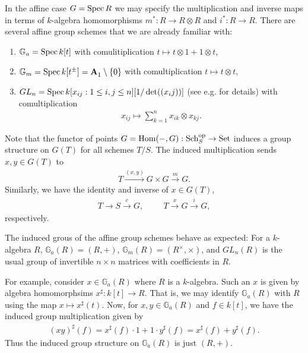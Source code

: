 \documentclass{article}
\begin{document}
\begin{example}
  In the affine case $G = \operatorname{Spec} R$ we may specify the multiplication
  and inverse maps in terms of $k$-algebra homomorphisms
  $m^* : R \to R\otimes R$ and $i^* : R\to R$.
  There are several affine group schemes that we are already familiar
  with:
  \begin{enumerate}
    \item $\mathbb{G}_a = \operatorname{Spec} k[t]$ with comulitiplication
      $t\mapsto t\otimes 1 + 1\otimes t$,
    \item $\mathbb{G}_m = \operatorname{Spec} k[t^\pm] = \mathbf{A}^{}_{1} \setminus \left\lbrace{0}\right\rbrace$ with comultiplication
      $t\mapsto t\otimes t$,
    \item $GL_n = \operatorname{Spec} k[x_{ij} : 1\leq i,j\leq n][1/\det((x_ij))]$
      (see e.g. \cite[\href{https://stacks.math.columbia.edu/tag/022W}{Tag 022W}]{stacks-project} for details) with
      comultiplication
      \begin{align*}
        x_{ij} \mapsto \sum_{k=1}^n x_{ik}\otimes x_{kj}.
      \end{align*}
  \end{enumerate}
\end{example}

Note that the functor of points $G=\operatorname{Hom}(-,G):{\operatorname{Sch}}^\text{op}_S\to\operatorname{Set}$ induces a
group structure on $G(T)$ for all schemes $T/S$. The induced multiplication
sends $x,y\in G(T)$ to
\begin{align}\label{eq:induced_multiplication_of_points}
  T \xrightarrow{(x,y)}
  G\times G\xrightarrow{m}
  G.
\end{align}
Similarly, we have the identity and inverse of $x\in G(T)$,
\begin{align*}
  T \rightarrow S \xrightarrow{e} G,\hspace{1cm}
  T \xrightarrow{x} G \xrightarrow{i} G,
\end{align*}
respectively.

\begin{example}
  The induced grous of the affine group schemes behave as expected:
  For a $k$-algebra $R$, $\mathbb{G}_a(R) = (R,+)$,
  $\mathbb{G}_m(R) = (R^\times,\times)$, and
  $GL_n(R)$ is the usual group of invertible $n\times n$ matrices
  with coefficients in $R$.

  For example, consider $x\in\mathbb{G}_a(R)$ where $R$ is
  a $k$-algebra. Such an $x$ is given by algebra homomorphsims
  $x^\sharp:k[t] \to R$. That is, we may identify $\mathbb{G}_a(R)$
  with $R$ using the map $x \mapsto x^\sharp(t)$. Now, for
  $x,y\in\mathbb{G}_a(R)$ and $f\in k[t]$, we have the induced group
  multiplication given by
  \begin{align*}
    (xy)^\sharp(f)
    = x^\sharp(f) \cdot 1 + 1 \cdot y^\sharp(f)
    = x^\sharp(f) + y^\sharp(f).
  \end{align*}
  Thus the induced group structure on $\mathbb{G}_a(R)$ is just $(R,+)$.
\end{example}
\end{document}
